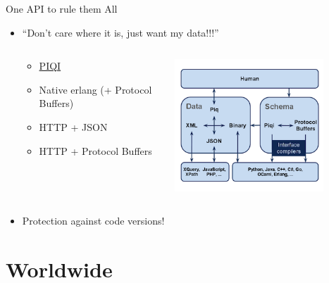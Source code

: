 \documentclass[aspectratio=169]{beamer}
\begin{document}
\begin{frame}{One API to rule them All}
    \begin{itemize}
        \item ``Don't care where it is, just want my data!!!''
        \pause
        \begin{columns}
            \begin{column}[c]{0.6\textwidth}
                    \begin{itemize}
                        \item \href{http://piqi.org}{PIQI}
                        \item Native erlang (+ Protocol Buffers)
                        \item HTTP + JSON
                        \item HTTP + Protocol Buffers
                    \end{itemize}
            \end{column}
            \begin{column}[c]{0.4\textwidth}
                \includegraphics[width=0.8\textwidth]{images/piqi.png}
            \end{column}
        \end{columns}
        \item Protection against code versions!
    \end{itemize}
\end{frame}

\section{Worldwide}
\end{document}
